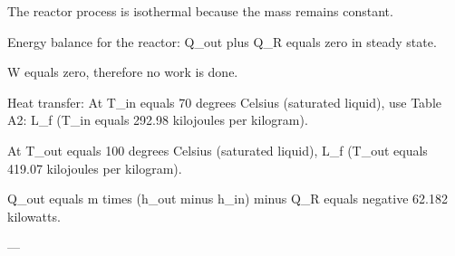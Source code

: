 The reactor process is isothermal because the mass remains constant.  

Energy balance for the reactor:  
Q_out plus Q_R equals zero in steady state.  

W equals zero, therefore no work is done.  

Heat transfer:  
At T_in equals 70 degrees Celsius (saturated liquid), use Table A2:  
L_f (T_in equals 292.98 kilojoules per kilogram).  

At T_out equals 100 degrees Celsius (saturated liquid), L_f (T_out equals 419.07 kilojoules per kilogram).  

Q_out equals m times (h_out minus h_in) minus Q_R equals negative 62.182 kilowatts.  

---